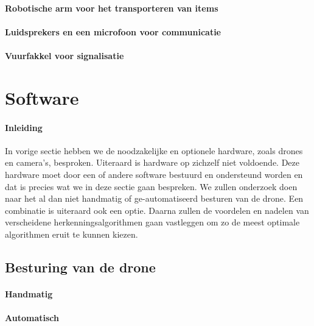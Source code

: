\lipsum[1-2]

\paragraph{Robotische arm voor het transporteren van items}

\lipsum[1-2]

\paragraph{Luidsprekers en een microfoon voor communicatie}

\lipsum[1-2]

\paragraph{Vuurfakkel voor signalisatie}

\lipsum[1-2]

\section{Software}

\paragraph{Inleiding}
In vorige sectie hebben we de noodzakelijke en optionele hardware, zoals drones en camera's, besproken. Uiteraard is hardware op zichzelf niet voldoende. Deze hardware moet door een of andere software bestuurd en ondersteund worden en dat is precies wat we in deze sectie gaan bespreken. We zullen onderzoek doen naar het al dan niet handmatig of ge-automatiseerd besturen van de drone. Een combinatie is uiteraard ook een optie. Daarna zullen de voordelen en nadelen van verscheidene herkenningsalgorithmen gaan vastleggen om zo de meest optimale algorithmen eruit te kunnen kiezen.

\subsection{Besturing van de drone}

\paragraph{Handmatig}

\lipsum[1-2]

\paragraph{Automatisch}

